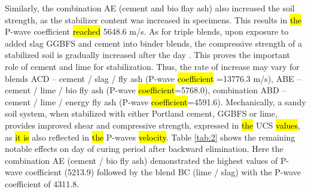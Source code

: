 \documentclass[materials,article,submit,pdftex,moreauthors]{Definitions/mdpi}
\begin{document}
Similarly, the combination AE (cement and bio flay ash) also increased the soil strength, as the stabilizer content was increased in specimens. This results in \hl{the} P-wave coefficient \hl{reached} 5648.6 m/s. As for triple blends, upon exposure to added slag GGBFS and cement into binder blends, the compressive strength of a stabilized soil is gradually increased after the day . This proves the important role of cement and lime for stabilization. Thus, the rate of increase may vary for blends ACD – cement / slag / fly ash (P-wave \hl{coefficient} =13776.3 m/s), ABE – cement / lime / bio fly ash (P-wave \hl{coefficient}=5768.0), combination ABD – cement / lime / energy fly ash (P-wave \hl{coefficient}=4591.6). Mechanically, a sandy soil system, when stabilized with either Portland cement, GGBFS or lime, provides improved shear and compressive strength, expressed in \hl{the} UCS \hl{values}, as \hl{it is} also reflected in \hl{the} P-waves \hl{velocity}. Table \ref{tab:2} shows the remaining notable effects on day  of curing period after backward elimination. Here the combination AE (cement / bio fly ash) demonstrated the highest values of P-wave coefficient (5213.9) followed by the blend BC (lime / slag) with the P-wave coefficient of 4311.8.
 
\end{document}
